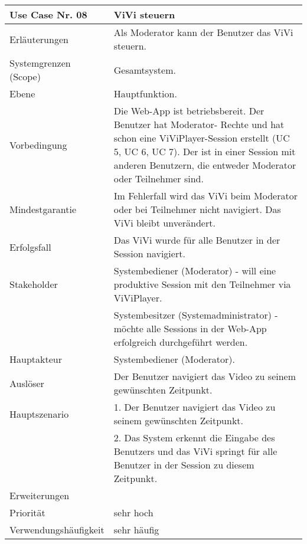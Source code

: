 \begin{tabularx}{\linewidth}{|l|X|}
	\hline
	Use Case Nr. 08			& \textbf{ViVi steuern} \\ \hline
	Erläuterungen			& Als Moderator kann der Benutzer das ViVi steuern. \\ \hline
	Systemgrenzen (Scope)	& Gesamtsystem. \\ \hline
	Ebene					& Hauptfunktion. \\ \hline
	Vorbedingung			& Die Web-App ist betriebsbereit. Der Benutzer hat Moderator-
							  Rechte und hat schon eine ViViPlayer-Session erstellt (UC 5, UC 6, UC 7). Der ist in einer Session mit anderen Benutzern, die entweder Moderator oder Teilnehmer sind. \\ \hline
	Mindestgarantie			& Im Fehlerfall wird das ViVi beim Moderator oder bei Teilnehmer 
							  nicht navigiert. Das ViVi bleibt unverändert. \\ \hline
	Erfolgsfall 			& Das ViVi wurde für alle Benutzer in der Session navigiert. 
							  \\ \hline
	Stakeholder				& Systembediener (Moderator) - will eine produktive Session mit den 
							  Teilnehmer via ViViPlayer. \\
							& Systembesitzer (Systemadministrator) - möchte alle Sessions in der 
							  Web-App erfolgreich durchgeführt werden. \\ \hline
	Hauptakteur				& Systembediener (Moderator). \\ \hline
	Auslöser				& Der Benutzer navigiert das Video zu seinem gewünschten 
							  Zeitpunkt. \\ \hline	
	Hauptszenario			& 1. Der Benutzer navigiert das Video zu seinem gewünschten
							  Zeitpunkt. \\
							& 2. Das System erkennt die Eingabe des Benutzers und
							  das ViVi springt für alle Benutzer in der Session zu diesem Zeitpunkt.
							  \\ \hline
	Erweiterungen			&  \\ \hline
	Priorität				& sehr hoch \\ \hline
	Verwendungshäufigkeit	& sehr häufig \\ \hline
\end{tabularx}